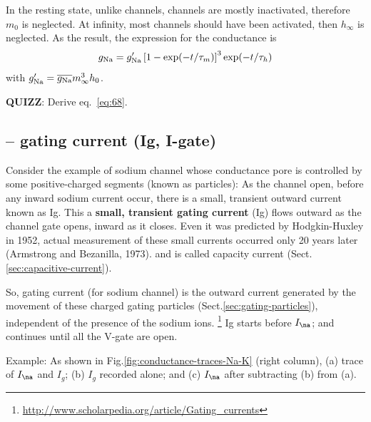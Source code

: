 In the resting state, unlike  channels,  channels are
mostly inactivated, therefore $m_0$ is neglected. At infinity, most
channels should have been activated, then $h_\infty$ is neglected. As
the result, the expression for the  conductance is
\begin{equation}
  \label{eq:68}
  g_{\ce{Na}} = g'_{\ce{Na}} \left[ 1 - \exp (-t/\tau_m) \right]^3 \exp (-t/\tau_h) 
\end{equation}
with $g'_{\ce{Na}} = \overline{g_{\ce{Na}}} m_\infty^3 h_0$.

{\bf QUIZZ}: Derive eq.~\eqref{eq:68}.


\subsection{-- gating current (Ig, I-gate)}
\label{sec:gating-current}

Consider the example of sodium channel whose conductance pore is controlled by
some positive-charged segments (known as particles):
As the channel open, before any inward sodium current occur, there is a small,
transient outward current known as Ig. This a {\bf small, transient gating
current} (Ig) flows outward as the channel gate opens, inward as it closes. 
Even it was predicted by Hodgkin-Huxley in 1952,  actual measurement of these
small currents occurred only 20 years later (Armstrong and Bezanilla, 1973).
and is called capacity current (Sect.\ref{sec:capacitive-current}).


So, gating current (for sodium channel) is the outward current generated by the
movement of these charged gating particles (Sect.\ref{sec:gating-particles}),
independent of the presence of the sodium ions.
\footnote{\url{http://www.scholarpedia.org/article/Gating_currents}}
Ig starts before $I_\na$; and continues until all the V-gate are open.



Example: As shown in Fig.\ref{fig:conductance-traces-Na-K} (right column), (a)
trace of $I_\na$ and $I_g$; (b) $I_g$ recorded alone; and (c) $I_\na$ after
subtracting (b) from (a).


